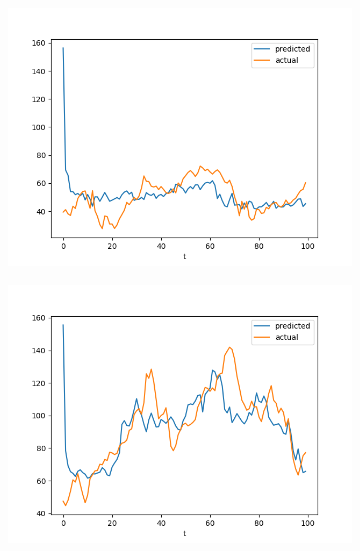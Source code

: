 \documentclass[runningheads]{llncs}
\begin{document}
    \begin{figure}
        \centering

        \begin{subfigure}{\figwidth}
            \includegraphics[width=\textwidth]{results/evaluation/c_model_graph_p10.png}
        \end{subfigure}
        \begin{subfigure}{\figwidth}
            \includegraphics[width=\textwidth]{results/evaluation/c_model_graph_p20.png}
        \end{subfigure}
        \begin{subfigure}{\figwidth}

\end{subfigure}
\end{figure}
\end{document}
